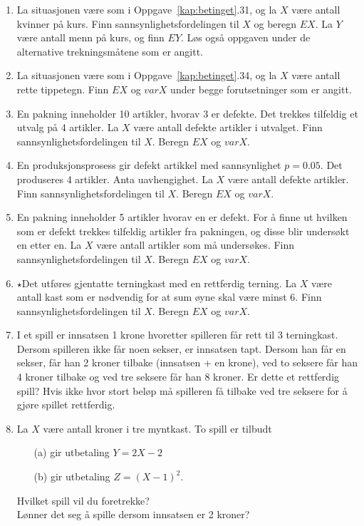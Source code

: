 \begin{enumerate}
\item La situasjonen være som i Oppgave~\ref*{kap:betinget}.31, og la $X$ være
     antall kvinner på kurs. Finn sannsynlighetsfordelingen til
     $X$ og beregn $EX$. La $Y$ være antall menn på kurs, og finn
     $EY$. Løs også oppgaven under de alternative trekningsmåtene
     som er angitt.

\item La situasjonen være som i Oppgave~\ref*{kap:betinget}.34, og la $X$ være
     antall rette tippetegn. Finn $EX$ og $varX$ under begge
     forutsetninger som er angitt.

\item En pakning inneholder 10 artikler, hvorav 3 er defekte. Det
     trekkes tilfeldig et utvalg på 4 artikler. La $X$ være
     antall defekte artikler i utvalget. Finn
     sannsynlighetsfordelingen til $X$. Beregn $EX$ og $varX$.

\item En produksjonsprosess gir defekt artikkel med sannsynlighet
     $p=0.05$. Det produseres 4 artikler. Anta uavhengighet. La
     $X$ være antall defekte artikler. Finn
     sannsynlighetsfordelingen til $X$. Beregn $EX$ og $varX$.

\item En pakning inneholder 5 artikler hvorav en er defekt. For å
     finne ut hvilken som er defekt trekkes tilfeldig artikler
     fra pakningen, og disse blir undersøkt en etter en. La $X$
     være antall artikler som må undersøkes. Finn
     sannsynlighetsfordelingen til $X$. Beregn $EX$ og $varX$.

\item $\star$Det utføres gjentatte terningkast med en rettferdig terning.
     La $X$ være antall kast som er nødvendig for at sum øyne
     skal være minst 6. Finn sannsynlighetsfordelingen til $X$.
     Beregn $EX$ og $varX$.

\item I et spill er innsatsen 1 krone hvoretter spilleren får rett
     til 3 terningkast. Dersom spilleren ikke får noen sekser, er
     innsatsen tapt. Dersom han får en sekser, får han 2 kroner
     tilbake (innsatsen + en krone), ved to seksere får han 4
     kroner tilbake og ved tre seksere får han 8 kroner. Er dette
     et rettferdig spill? Hvis ikke hvor stort beløp må spilleren
     få tilbake ved tre seksere for å gjøre spillet rettferdig.

\item La $X$ være antall kroner i tre myntkast. To spill er tilbudt
     \begin{itemize}
     \item[(a)]  gir utbetaling $Y=2X-2$ 
     \item[(b)]  gir utbetaling $Z=(X-1)^2$.
     \end{itemize}
     Hvilket spill vil du foretrekke?\\
     Lønner det seg å spille dersom innsatsen er 2 kroner?


\end{enumerate}
